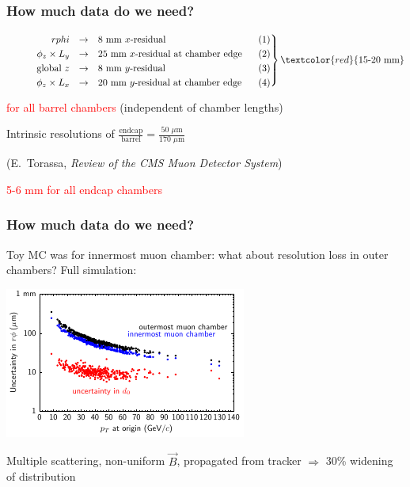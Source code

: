 \documentclass[compress]{beamer}
\begin{document}
\begin{frame}
\frametitle{How much data do we need?}

$\left.
\mbox{\begin{minipage}{0.8\linewidth}
\vspace{-\baselineskip}
\begin{eqnarray*}
  rphi &\to& \mbox{8 mm $x$-residual} \\
  \phi_z \times L_y &\to& \mbox{25 mm $x$-residual at chamber edge} \\
  \mbox{global } z &\to& \mbox{8 mm $y$-residual} \\
  \phi_z \times L_x &\to& \mbox{20 mm $y$-residual at chamber edge}
\end{eqnarray*}
\end{minipage}}
\right\} \textcolor{red}{\mbox{15-20 mm}}$

\vspace{0.35 cm}
\textcolor{red}{for all barrel chambers} (independent of chamber lengths)

\vfill
Intrinsic resolutions of $\displaystyle \frac{\mbox{endcap}}{\mbox{barrel}} = \frac{\mbox{50 $\mu$m}}{\mbox{170 $\mu$m}}$
\hfill \begin{minipage}{3 cm}
\small (E.\ Torassa, {\it Review of the CMS Muon Detector System})
\end{minipage}

\vfill
\textcolor{red}{5-6 mm for all endcap chambers}

\end{frame}

\begin{frame}
\frametitle{How much data do we need?}

Toy MC was for innermost muon chamber: what about resolution loss in
outer chambers?  Full simulation:

\begin{center}
\includegraphics[width=0.7\linewidth]{degradation_of_residuals3}
\end{center}

\vspace{-0.3 cm}
Multiple scattering, non-uniform $\vec{B}$, propagated from tracker
$\Rightarrow$ 30\% widening of distribution
\end{frame}
\end{document}
